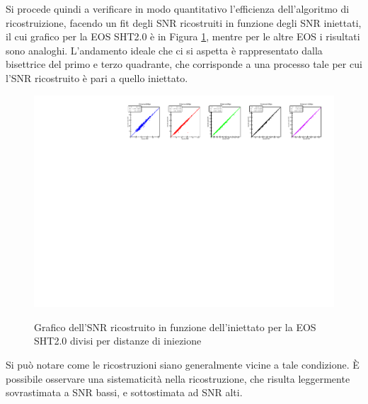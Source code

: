 Si procede quindi a verificare in modo quantitativo l'efficienza dell'algoritmo di ricostruizione, facendo un fit degli SNR ricostruiti in funzione degli SNR iniettati, il cui grafico per la EOS SHT2.0 è in Figura \ref{fig:overlap}, mentre per le altre EOS i risultati sono analoghi. L'andamento ideale che ci si aspetta è rappresentato dalla bisettrice del primo e terzo quadrante, che corrisponde a una processo tale per cui l'SNR ricostruito è pari a quello iniettato.
\begin{figure}[hbt!]
	\vspace{-5pt}
	\centering
	{\includegraphics[width=1\textwidth]{figures/Capitolo_3/report/FITSHT2_0spin1.pdf}}
	\vspace{-15pt}
	\caption{Grafico dell'SNR ricostruito in funzione dell'iniettato per la EOS SHT2.0 divisi per distanze di iniezione}
	\label{fig:overlap}
	\vspace{-5pt}
\end{figure}
Si può notare come le ricostruzioni siano generalmente vicine a tale condizione. È possibile osservare una sistematicità nella ricostruzione, che risulta leggermente sovrastimata a SNR bassi, e sottostimata ad SNR alti.

